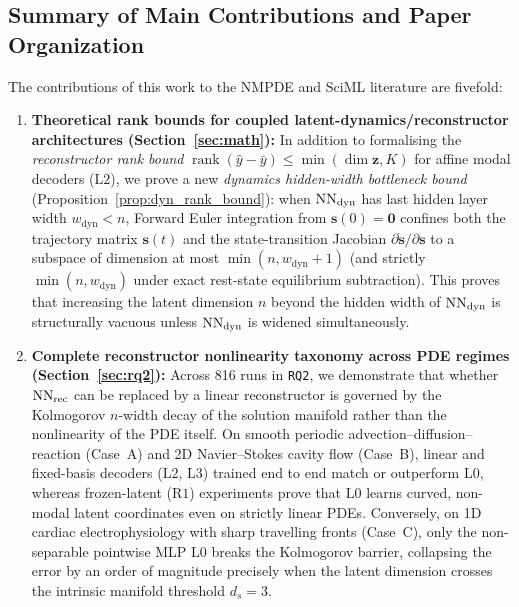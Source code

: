 \subsection{Summary of Main Contributions and Paper Organization}

The contributions of this work to the NMPDE and SciML literature are fivefold:
\begin{enumerate}[leftmargin=2em]
  \item \textbf{Theoretical rank bounds for coupled latent-dynamics/reconstructor architectures (Section~\ref{sec:math}):} In addition to formalising the \emph{reconstructor rank bound} $\operatorname{rank}(\hat{y}-\bar{y}) \le \min(\dim\mathbf{z}, K)$ for affine modal decoders ($\mathrm{L2}$), we prove a new \emph{dynamics hidden-width bottleneck bound} (Proposition~\ref{prop:dyn_rank_bound}): when $\mathrm{NN}_{\mathrm{dyn}}$ has last hidden layer width $w_{\mathrm{dyn}} < n$, Forward Euler integration from $\mathbf{s}(0)=\mathbf{0}$ confines both the trajectory matrix $\mathbf{s}(t)$ and the state-transition Jacobian $\partial\dot{\mathbf{s}}/\partial\mathbf{s}$ to a subspace of dimension at most $\min(n, w_{\mathrm{dyn}}+1)$ (and strictly $\min(n, w_{\mathrm{dyn}})$ under exact rest-state equilibrium subtraction). This proves that increasing the latent dimension $n$ beyond the hidden width of $\mathrm{NN}_{\mathrm{dyn}}$ is structurally vacuous unless $\mathrm{NN}_{\mathrm{dyn}}$ is widened simultaneously.
  \item \textbf{Complete reconstructor nonlinearity taxonomy across PDE regimes (Section~\ref{sec:rq2}):} Across 816 runs in \texttt{RQ2}, we demonstrate that whether $\mathrm{NN}_{\mathrm{rec}}$ can be replaced by a linear reconstructor is governed by the Kolmogorov $n$-width decay of the solution manifold rather than the nonlinearity of the PDE itself. On smooth periodic advection--diffusion--reaction (Case~A) and 2D Navier--Stokes cavity flow (Case~B), linear and fixed-basis decoders ($\mathrm{L2}$, $\mathrm{L3}$) trained end to end match or outperform $\mathrm{L0}$, whereas frozen-latent ($\mathrm{R1}$) experiments prove that $\mathrm{L0}$ learns curved, non-modal latent coordinates even on strictly linear PDEs. Conversely, on 1D cardiac electrophysiology with sharp travelling fronts (Case~C), only the non-separable pointwise MLP $\mathrm{L0}$ breaks the Kolmogorov barrier, collapsing the error by an order of magnitude precisely when the latent dimension crosses the intrinsic manifold threshold $d_s = 3$.

\end{enumerate}
